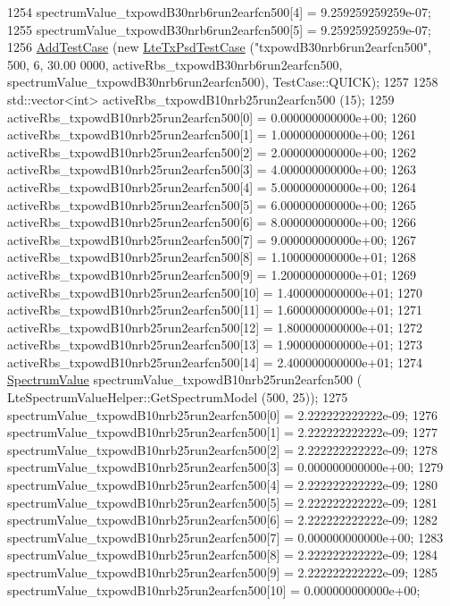 \begin{DoxyCode}
1254   spectrumValue\_txpowdB30nrb6run2earfcn500[4] = 9.259259259259e-07;
1255   spectrumValue\_txpowdB30nrb6run2earfcn500[5] = 9.259259259259e-07;
1256   \hyperlink{classns3_1_1TestCase_a3718088e3eefd5d6454569d2e0ddd835}{AddTestCase} (\textcolor{keyword}{new} \hyperlink{classLteTxPsdTestCase}{LteTxPsdTestCase} (\textcolor{stringliteral}{"txpowdB30nrb6run2earfcn500"}, 500, 6, 30.00
      0000, activeRbs\_txpowdB30nrb6run2earfcn500, spectrumValue\_txpowdB30nrb6run2earfcn500), TestCase::QUICK);
1257 
1258   std::vector<int> activeRbs\_txpowdB10nrb25run2earfcn500 (15);
1259   activeRbs\_txpowdB10nrb25run2earfcn500[0] = 0.000000000000e+00;
1260   activeRbs\_txpowdB10nrb25run2earfcn500[1] = 1.000000000000e+00;
1261   activeRbs\_txpowdB10nrb25run2earfcn500[2] = 2.000000000000e+00;
1262   activeRbs\_txpowdB10nrb25run2earfcn500[3] = 4.000000000000e+00;
1263   activeRbs\_txpowdB10nrb25run2earfcn500[4] = 5.000000000000e+00;
1264   activeRbs\_txpowdB10nrb25run2earfcn500[5] = 6.000000000000e+00;
1265   activeRbs\_txpowdB10nrb25run2earfcn500[6] = 8.000000000000e+00;
1266   activeRbs\_txpowdB10nrb25run2earfcn500[7] = 9.000000000000e+00;
1267   activeRbs\_txpowdB10nrb25run2earfcn500[8] = 1.100000000000e+01;
1268   activeRbs\_txpowdB10nrb25run2earfcn500[9] = 1.200000000000e+01;
1269   activeRbs\_txpowdB10nrb25run2earfcn500[10] = 1.400000000000e+01;
1270   activeRbs\_txpowdB10nrb25run2earfcn500[11] = 1.600000000000e+01;
1271   activeRbs\_txpowdB10nrb25run2earfcn500[12] = 1.800000000000e+01;
1272   activeRbs\_txpowdB10nrb25run2earfcn500[13] = 1.900000000000e+01;
1273   activeRbs\_txpowdB10nrb25run2earfcn500[14] = 2.400000000000e+01;
1274   \hyperlink{classns3_1_1SpectrumValue}{SpectrumValue} spectrumValue\_txpowdB10nrb25run2earfcn500 (
      LteSpectrumValueHelper::GetSpectrumModel (500, 25));
1275   spectrumValue\_txpowdB10nrb25run2earfcn500[0] = 2.222222222222e-09;
1276   spectrumValue\_txpowdB10nrb25run2earfcn500[1] = 2.222222222222e-09;
1277   spectrumValue\_txpowdB10nrb25run2earfcn500[2] = 2.222222222222e-09;
1278   spectrumValue\_txpowdB10nrb25run2earfcn500[3] = 0.000000000000e+00;
1279   spectrumValue\_txpowdB10nrb25run2earfcn500[4] = 2.222222222222e-09;
1280   spectrumValue\_txpowdB10nrb25run2earfcn500[5] = 2.222222222222e-09;
1281   spectrumValue\_txpowdB10nrb25run2earfcn500[6] = 2.222222222222e-09;
1282   spectrumValue\_txpowdB10nrb25run2earfcn500[7] = 0.000000000000e+00;
1283   spectrumValue\_txpowdB10nrb25run2earfcn500[8] = 2.222222222222e-09;
1284   spectrumValue\_txpowdB10nrb25run2earfcn500[9] = 2.222222222222e-09;
1285   spectrumValue\_txpowdB10nrb25run2earfcn500[10] = 0.000000000000e+00;

\end{DoxyCode}
